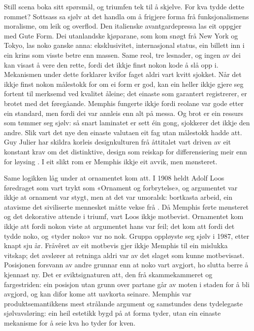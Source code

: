 Still scena boka sitt spørsmål, og triumfen tek til å skjelve. For kva tydde dette rommet? Sottsass sa sjølv at det handla om å frigjere forma frå funksjonalismens moralisme, om leik og overflod. Den italienske avantgardepressa las eit oppgjer med Gute Form. Dei utanlandske kjøparane, som kom snøgt frå New York og Tokyo, las noko ganske anna: eksklusivitet, internasjonal status, ein billett inn i ein krins som visste betre enn massen. Same reol, tre lesnader, og ingen av dei kan visast å vere den rette, fordi det ikkje finst nokon kode å slå opp i. Mekanismen under dette forklarer kvifor faget aldri vart kvitt sjokket. Når det ikkje finst nokon målestokk for om ei form er god, kan ein heller ikkje gjere seg fortent til merksemd ved kvalitet åleine; det einaste som garantert registrerer, er brotet med det føregåande. Memphis fungerte ikkje fordi reolane var gode etter ein standard, men fordi dei var annleis enn alt på messa. Og brot er ein ressurs som tømmer seg sjølv: så snart laminatet er sett éin gong, sjokkerer det ikkje den andre. Slik vart det nye den einaste valutaen eit fag utan målestokk hadde att. Guy Julier har skildra korleis designkulturen frå åttitalet vart driven av eit konstant krav om det distinktive, design som reiskap for differensiering meir enn for løysing \autocite{julier2000}. I eit slikt rom er Memphis ikkje eit avvik, men mønsteret.

Same logikken låg under at ornamentet kom att. I 1908 heldt Adolf Loos føredraget som vart trykt som «Ornament og forbrytelse», og argumentet var ikkje at ornament var stygt, men at det var umoralsk: bortkasta arbeid, ein atavisme det siviliserte mennesket måtte vekse frå \autocite{loos1908ornament}. Då Memphis førte mønsteret og det dekorative attende i triumf, vart Loos ikkje motbevist. Ornamentet kom ikkje att fordi nokon viste at argumentet hans var feil; det kom att fordi det tydde noko, og «tyder noko» var no nok. Gruppa oppløyste seg sjølv i 1987, etter knapt sju år. Fråvêret av eit motbevis gjer ikkje Memphis til ein mislukka vitskap; det avslører at retninga aldri var av det slaget som kunne motbevisast. Posisjonen forsvann av andre grunnar enn at noko vart avgjort, ho slutta berre å kjennast ny. Det er sviktsignaturen att, den frå skammekammeret og fargestriden: ein posisjon utan grunn over partane går av moten i staden for å bli avgjord, og kan difor kome att uavkorta seinare. Memphis var produktsemantikkens mest strålande argument og samstundes dens tydelegaste sjølvavsløring: ein heil estetikk bygd på at forma tyder, utan ein einaste mekanisme for å seie kva ho tyder for kven.

